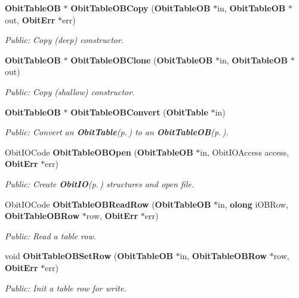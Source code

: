 \begin{CompactItemize}
{\bf Obit\-Table\-OB} $\ast$ {\bf Obit\-Table\-OBCopy} ({\bf Obit\-Table\-OB} $\ast$in, {\bf Obit\-Table\-OB} $\ast$out, {\bf Obit\-Err} $\ast$err)
\begin{CompactList}\small\item\em Public: Copy (deep) constructor. \item\end{CompactList}\item 
{\bf Obit\-Table\-OB} $\ast$ {\bf Obit\-Table\-OBClone} ({\bf Obit\-Table\-OB} $\ast$in, {\bf Obit\-Table\-OB} $\ast$out)
\begin{CompactList}\small\item\em Public: Copy (shallow) constructor. \item\end{CompactList}\item 
{\bf Obit\-Table\-OB} $\ast$ {\bf Obit\-Table\-OBConvert} ({\bf Obit\-Table} $\ast$in)
\begin{CompactList}\small\item\em Public: Convert an {\bf Obit\-Table}{\rm (p.\,\pageref{structObitTable})} to an {\bf Obit\-Table\-OB}{\rm (p.\,\pageref{structObitTableOB})}. \item\end{CompactList}\item 
Obit\-IOCode {\bf Obit\-Table\-OBOpen} ({\bf Obit\-Table\-OB} $\ast$in, Obit\-IOAccess access, {\bf Obit\-Err} $\ast$err)
\begin{CompactList}\small\item\em Public: Create {\bf Obit\-IO}{\rm (p.\,\pageref{structObitIO})} structures and open file. \item\end{CompactList}\item 
Obit\-IOCode {\bf Obit\-Table\-OBRead\-Row} ({\bf Obit\-Table\-OB} $\ast$in, {\bf olong} i\-OBRow, {\bf Obit\-Table\-OBRow} $\ast$row, {\bf Obit\-Err} $\ast$err)
\begin{CompactList}\small\item\em Public: Read a table row. \item\end{CompactList}\item 
void {\bf Obit\-Table\-OBSet\-Row} ({\bf Obit\-Table\-OB} $\ast$in, {\bf Obit\-Table\-OBRow} $\ast$row, {\bf Obit\-Err} $\ast$err)
\begin{CompactList}\small\item\em Public: Init a table row for write. \item\end{CompactList}\item 

\end{CompactItemize}
